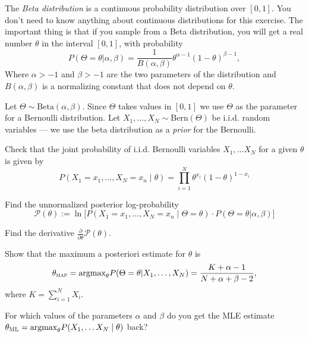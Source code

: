 \documentclass[a4paper,10pt,landscape,twocolumn]{scrartcl}
\begin{document}
\begin{exercise}
	The \emph{Beta distribution} is a continuous probability distribution over $[0,1]$. You don't need to know anything about continuous distributions for this exercise. The important thing is that if you sample from a Beta distribution, you will get a real number $\theta$ in the interval $[0, 1]$, with probability
	\[
		P(\Theta = \theta|\alpha, \beta) = \frac{1}{B(\alpha, \beta)} \theta^{\alpha-1} (1-\theta)^{\beta-1},
	\] 
	Where $\alpha > -1$ and $\beta > -1$ are the two parameters of the distribution and $B(\alpha, \beta)$ is a normalizing constant that does not depend on $\theta$.

	Let $\Theta \sim \text{Beta}(\alpha, \beta)$. Since $\Theta$ takes values in $[0,1]$ we use $\Theta$ as the parameter for a Bernoulli distribution. Let $X_1, \dots, X_N \sim \text{Bern}(\Theta)$ be i.i.d. random variables --- we use the beta distribution as a \emph{prior} for the Bernoulli.
	
	\begin{subex}
	Check that the joint probability of i.i.d. Bernoulli variables $X_1, \dots X_N$ for a given $\theta$ is given by
	\[
	P(X_1=x_1, \dots, X_N=x_n \mid \theta) = \prod_{i=1}^N \theta^{x_i} (1-\theta)^{1-x_i}
	\]	
	\end{subex}

	\begin{subex}
		Find the unnormalized posterior log-probability 
		\[
			\mathcal P(\theta) := \ln \bigl[ P(X_1=x_1, \dots, X_N=x_n \mid \Theta=\theta) \cdot P(\Theta = \theta| \alpha, \beta)\bigr]
		\]
	\end{subex}

	\begin{subex}
	Find the derivative $\frac{\partial}{\partial \theta} \mathcal P(\theta)$.	
	\end{subex}
	
	\begin{subex}
	Show that the maximum a posteriori estimate 	for $\theta$ is 
	\[
		\theta_\textsc{map} 
			= \text{argmax}_\theta P(\Theta = \theta | X_1, \dots, X_N)
			= \frac{K + \alpha - 1}{N + \alpha + \beta - 2}, 
	\]
	where $K = \sum_{i=1}^N X_i$.
	\end{subex}
	
	\begin{subex}
		For which values of the parameters $\alpha$ and $\beta$ do you get the MLE estimate $\theta_\textsc{ML} = \text{argmax}_\theta P(X_1, \dots X_N \mid \theta)$ back? 
	\end{subex}


\end{exercise}
\end{document}
